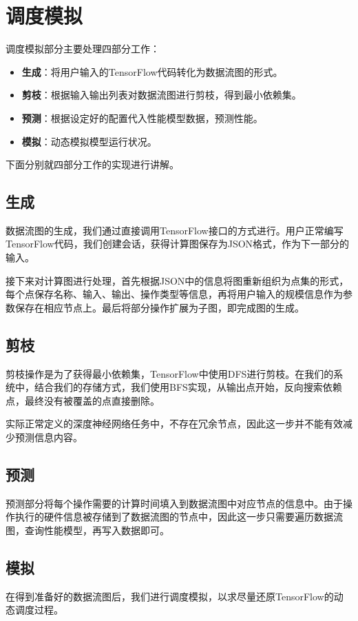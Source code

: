 \section{调度模拟}
    调度模拟部分主要处理四部分工作：
    \begin{itemize}
        \setlength{\itemindent}{1em}
        \item {\bfseries 生成}：将用户输入的TensorFlow代码转化为数据流图的形式。
        \item {\bfseries 剪枝}：根据输入输出列表对数据流图进行剪枝，得到最小依赖集。
        \item {\bfseries 预测}：根据设定好的配置代入性能模型数据，预测性能。
        \item {\bfseries 模拟}：动态模拟模型运行状况。
    \end{itemize}
    
    下面分别就四部分工作的实现进行讲解。

\subsection{生成}
    数据流图的生成，我们通过直接调用TensorFlow接口的方式进行。用户正常编写TensorFlow代码，我们创建会话，获得计算图保存为JSON格式，作为下一部分的输入。

    接下来对计算图进行处理，首先根据JSON中的信息将图重新组织为点集的形式，每个点保存名称、输入、输出、操作类型等信息，再将用户输入的规模信息作为参数保存在相应节点上。最后将部分操作扩展为子图，即完成图的生成。

\subsection{剪枝}
    剪枝操作是为了获得最小依赖集，TensorFlow中使用DFS进行剪枝。在我们的系统中，结合我们的存储方式，我们使用BFS实现，从输出点开始，反向搜索依赖点，最终没有被覆盖的点直接删除。

    实际正常定义的深度神经网络任务中，不存在冗余节点，因此这一步并不能有效减少预测信息内容。

\subsection{预测}
    预测部分将每个操作需要的计算时间填入到数据流图中对应节点的信息中。由于操作执行的硬件信息被存储到了数据流图的节点中，因此这一步只需要遍历数据流图，查询性能模型，再写入数据即可。

\subsection{模拟}
    在得到准备好的数据流图后，我们进行调度模拟，以求尽量还原TensorFlow的动态调度过程。

